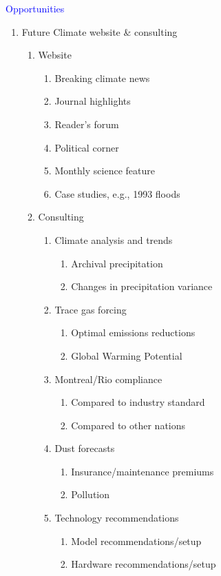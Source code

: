 \documentclass[12pt]{article}
\begin{document}
\raggedright %

\Large\textcolor{blue}{\hfill Opportunities \hfill}\vspace{-0.5in}\large
\begin{enumerate}
\item Future Climate website \& consulting 
\begin{enumerate}
\item Website
\begin{enumerate}
\item Breaking climate news
\item Journal highlights
\item Reader's forum
\item Political corner
\item Monthly science feature
\item Case studies, e.g., 1993 floods
\end{enumerate}

\clearpage
\item Consulting
\begin{enumerate}
\item Climate analysis and trends
\begin{enumerate}
\item Archival precipitation
\item Changes in precipitation variance 
\end{enumerate}
\item Trace gas forcing
\begin{enumerate}
\item Optimal emissions reductions
\item Global Warming Potential
\end{enumerate}
\item Montreal/Rio compliance
\begin{enumerate}
\item Compared to industry standard
\item Compared to other nations
\end{enumerate}
\item Dust forecasts
\begin{enumerate}
\item Insurance/maintenance premiums
\item Pollution
\end{enumerate}
\item Technology recommendations
\begin{enumerate}
\item Model recommendations/setup
\item Hardware recommendations/setup
\end{enumerate}
\end{enumerate}
\end{enumerate}
\end{enumerate}
\end{document}

